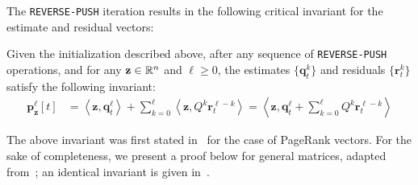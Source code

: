 The \texttt{REVERSE-PUSH} iteration results in the following critical invariant for the estimate and residual vectors:
\begin{lemma}
\label{lem:pushinvariant}
Given the initialization described above, after any sequence of \texttt{REVERSE-PUSH} operations, and for any $\mathbf{z}\in\mathbb{R}^n$ and $\ell\geq 0$, the estimates $\{\mathbf{q}_t^k\}$ and residuals $\{\mathbf{r}_t^k\}$  satisfy the following invariant:
\begin{align*}
\mathbf{p}_\mathbf{z}^{\ell}[t] &= \left< \mathbf{z}, \mathbf{q}_t^{\ell} \right> + \sum_{k=0}^{\ell} \left<\mathbf{z}, Q^k\mathbf{r}_t^{\ell-k}\right> = \left< \mathbf{z}, \mathbf{q}_t^{\ell}  + \sum_{k=0}^{\ell} Q^k\mathbf{r}_t^{\ell-k}\right>
\end{align*}
\end{lemma}

The above invariant was first stated in~\cite{andersen2007local} for the case of PageRank vectors. 
For the sake of completeness, we present a proof below for general matrices, adapted from~\cite{Lofgren2014}; an identical invariant is given in~\cite{lee2014asynchronous}.

